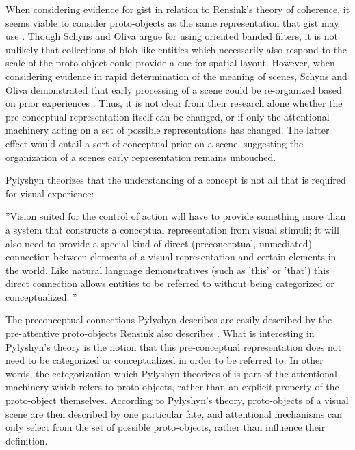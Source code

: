 \documentclass[a4paper,10pt,final]{ThesisStyle}
\begin{document}
When considering evidence for gist in relation to Rensink's theory of coherence, it seems viable to consider proto-objects as the same representation that gist may use \cite{Rensink2002}.  Though Schyns and Oliva argue for using oriented banded filters, it is not unlikely that collections of blob-like entities which necessarily also respond to the scale of the proto-object could provide a cue for spatial layout.   However, when considering evidence in rapid determination of the meaning of scenes, Schyns and Oliva demonstrated that early processing of a scene could be re-organized based on prior experiences \cite{Schyns1994,Oliva1997}.  Thus, it is not clear from their research alone whether the pre-conceptual representation itself can be changed, or if only the attentional machinery acting on a set of possible representations has changed.  The latter effect would entail a sort of conceptual prior on a scene, suggesting the organization of a scenes early representation remains untouched.

Pylyshyn theorizes that the understanding of a concept is not all that is required for visual experience: 
\begin{quotationb}
''Vision suited for the control of action will have to provide something more than a system that constructs a conceptual representation from visual stimuli; it will also need to provide a special kind of direct (preconceptual, unmediated) connection between elements of a visual representation and certain elements in the world. Like natural language demonstratives (such as 'this' or 'that') this direct connection allows entities to be referred to without being categorized or conceptualized. \cite{Pylyshyn2001}''
\end{quotationb}  
The preconceptual connections Pylyshyn describes are easily described by the pre-attentive proto-objects Rensink also describes \cite{Rensink2000,Rensink2001}.  What is interesting in Pylyshyn's theory is the notion that this pre-conceptual representation does not need to be categorized or conceptualized in order to be referred to.  In other words, the categorization which Pylyshyn theorizes of is part of the attentional machinery which refers to proto-objects, rather than an explicit property of the proto-object themselves.  According to Pylyshyn's theory, proto-objects of a visual scene are then described by one particular fate, and attentional mechanisms can only select from the set of possible proto-objects, rather than influence their definition. 
\end{document}
